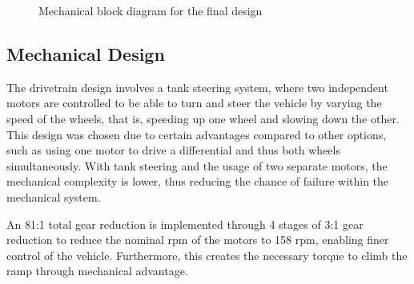\documentclass[11pt]{article}
\begin{document}
\begin{figure}
    \centering
    \caption{Mechanical block diagram for the final design}
    \label{fig:mbd2}
\end{figure}

\subsection{Mechanical Design}
The drivetrain design involves a tank steering system, where two independent motors are controlled to be able to turn and steer the vehicle by varying the speed of the wheels, that is, speeding up one wheel and slowing down the other. This design was chosen due to certain advantages compared to other options, such as using one motor to drive a differential and thus both wheels simultaneously. With tank steering and the usage of two separate motors, the mechanical complexity is lower, thus reducing the chance of failure within the mechanical system. 

An 81:1 total gear reduction is implemented through 4 stages of 3:1 gear reduction to reduce the nominal rpm of the motors to 158 rpm, enabling finer control of the vehicle. Furthermore, this creates the necessary torque to climb the ramp through mechanical advantage. 
\end{document}
